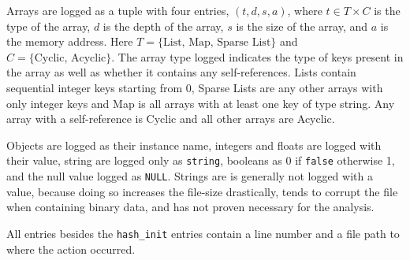 Arrays are logged as a tuple with four entries, $(t,d,s,a)$, where $t\in T\times C$ is the type of the array, $d$ is the depth of the array, $s$ is the size of the array, and $a$ is the memory address. Here $T = \{\text{List, Map, Sparse List}\}$ and $C = \{\text{Cyclic, Acyclic}\}$. The array type logged indicates the type of keys present in the array as well as whether it contains any self-references. Lists contain sequential integer keys starting from 0, Sparse Lists are any other arrays with only integer keys and Map is all arrays with at least one key of type string. Any array with a self-reference is Cyclic and all other arrays are Acyclic.

Objects are logged as their instance name, integers and floats are logged with their value, string are logged only as \texttt{string}, booleans as $0$ if \texttt{false} otherwise 1, and the null value logged as \texttt{NULL}. Strings are is generally not logged with a value, because doing so increases the file-size drastically, tends to corrupt the file when containing binary data, and has not proven necessary for the analysis.

All entries besides the \texttt{hash\_init} entries contain a line number and a file path to where the action occurred. 

